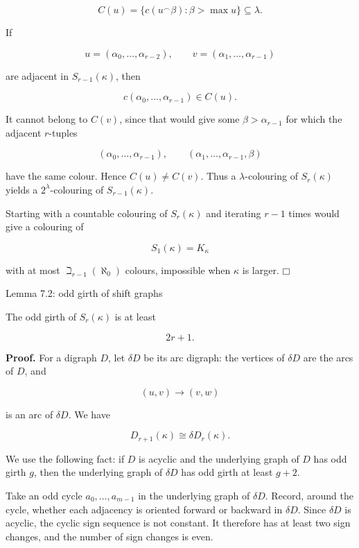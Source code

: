 \documentclass[11pt]{article}
\providecommand{\square}{\mdlgwhtsquare}
\begin{document}
\[
C(u)=\{c(u^\frown\beta):\beta>\max u\}\subseteq\lambda.
\]

If

\[
u=(\alpha_0,\ldots,\alpha_{r-2}),
\qquad
v=(\alpha_1,\ldots,\alpha_{r-1})
\]

are adjacent in \(S_{r-1}(\kappa)\), then

\[
c(\alpha_0,\ldots,\alpha_{r-1})\in C(u).
\]

It cannot belong to \(C(v)\), since that would give some \(\beta>\alpha_{r-1}\) for which the adjacent \(r\)-tuples

\[
(\alpha_0,\ldots,\alpha_{r-1}),
\qquad
(\alpha_1,\ldots,\alpha_{r-1},\beta)
\]

have the same colour. Hence \(C(u)\ne C(v)\). Thus a \(\lambda\)-colouring of \(S_r(\kappa)\) yields a \(2^\lambda\)-colouring of \(S_{r-1}(\kappa)\).

Starting with a countable colouring of \(S_r(\kappa)\) and iterating \(r-1\) times would give a colouring of

\[
S_1(\kappa)=K_\kappa
\]

with at most \(\beth_{r-1}(\aleph_0)\) colours, impossible when \(\kappa\) is larger. \(\square\)

\label{lemma-7.2-odd-girth-of-shift-graphs}
\begin{lemmabox}{Lemma 7.2: odd girth of shift graphs}

The odd girth of \(S_r(\kappa)\) is at least

\[
2r+1.
\]

\end{lemmabox}
\textbf{Proof.} For a digraph \(D\), let \(\delta D\) be its arc digraph: the vertices of \(\delta D\) are the arcs of \(D\), and

\[
(u,v)\longrightarrow(v,w)
\]

is an arc of \(\delta D\). We have

\[
D_{r+1}(\kappa)\cong\delta D_r(\kappa).
\]

We use the following fact: if \(D\) is acyclic and the underlying graph of \(D\) has odd girth \(g\), then the underlying graph of \(\delta D\) has odd girth at least \(g+2\).

Take an odd cycle \(a_0,\ldots,a_{m-1}\) in the underlying graph of \(\delta D\). Record, around the cycle, whether each adjacency is oriented forward or backward in \(\delta D\). Since \(\delta D\) is acyclic, the cyclic sign sequence is not constant. It therefore has at least two sign changes, and the number of sign changes is even.
\end{document}
